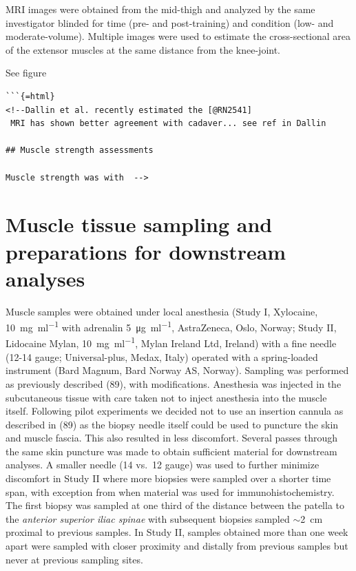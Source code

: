 \documentclass[twoside,10pt]{gihclass} %
\begin{document}
MRI images were obtained from the mid-thigh and analyzed by the same
investigator blinded for time (pre- and post-training) and condition
(low- and moderate-volume). Multiple images were used to estimate the
cross-sectional area of the extensor muscles at the same distance from
the knee-joint.

See figure
\begin{verbatim}
```{=html}
<!--Dallin et al. recently estimated the [@RN2541]
 MRI has shown better agreement with cadaver... see ref in Dallin 

## Muscle strength assessments

Muscle strength was with  -->
\end{verbatim}
\hypertarget{muscle-tissue-sampling-and-preparations-for-downstream-analyses}{%
\section{Muscle tissue sampling and preparations for downstream analyses}\label{muscle-tissue-sampling-and-preparations-for-downstream-analyses}}

Muscle samples were obtained under local anesthesia (Study I, Xylocaine,
\SI{10}{\mg\per\ml} with adrenalin \SI{5}{\micro\gram\per\ml},
AstraZeneca, Oslo, Norway; Study II, Lidocaine Mylan,
\SI{10}{\mg\per\ml}, Mylan Ireland Ltd, Ireland) with a fine needle
(12-14 gauge; Universal-plus, Medax, Italy) operated with a
spring-loaded instrument (Bard Magnum, Bard Norway AS, Norway). Sampling
was performed as previously described
(89), with
modifications. Anesthesia was injected in the subcutaneous tissue with
care taken not to inject anesthesia into the muscle itself. Following
pilot experiments we decided not to use an insertion cannula as
described in (89) as the biopsy needle itself could be used to
puncture the skin and muscle fascia. This also resulted in less
discomfort. Several passes through the same skin puncture was made to
obtain sufficient material for downstream analyses. A smaller needle (14
vs.~12 gauge) was used to further minimize discomfort in Study II where
more biopsies were sampled over a shorter time span, with exception from
when material was used for immunohistochemistry. The first biopsy was
sampled at one third of the distance between the patella to the
\emph{anterior superior iliac spinae} with subsequent biopsies sampled
\(\sim\)\SI{2}{cm} proximal to previous samples. In Study II, samples
obtained more than one week apart were sampled with closer proximity and
distally from previous samples but never at previous sampling sites.
\end{document}
